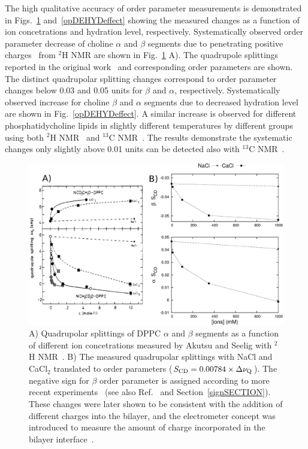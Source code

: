 \documentclass[aps,prl,superscriptaddress,twocolumn]{revtex4}
\begin{document}
The high qualitative accuracy of order parameter measurements is demonstrated in Figs.~\ref{opIONeffect} and~\ref{opDEHYDeffect}
showing the measured changes as a function of ion concetrations and hydration level, respectively.
Systematically observed order parameter decrease of choline $\alpha$ and $\beta$ segments due to penetrating 
positive charges~\cite{akutsu81,altenbach84,seelig87,scherer89} from $^2$H NMR are shown in Fig.~\ref{opIONeffect} A).
The quadrupole splittings reported in the original work~\cite{akutsu81} and corresponding order parameters 
are shown. The distinct quadrupolar splitting changes correspond to order parameter changes below 0.03 and 
0.05 units for $\beta$ and $\alpha$, respectively. Systematically observed increase for choline $\beta$ and $\alpha$
segments due to decreased hydration level are shown in Fig.~\ref{opDEHYDeffect}. 
A similar increase is observed for different phosphatidycholine lipids in slightly different temperatures by
different groups using both $^2$H NMR~\cite{bechinger91,ulrich94} and $^{13}$C NMR~\cite{dvinskikh05b}.
The results demonstrate the systematic changes only slightly above 0.01 units can be detected also with $^{13}$C NMR~\cite{dvinskikh05b}.

\begin{figure}[]
  \includegraphics[width=17.2cm]{../Fig/QPandOPwithIONS.eps}
  \caption{\label{opIONeffect}
    A) Quadrupolar splittings of DPPC $\alpha$ and $\beta$ segments as a function of different 
    ion concetrations measured by Akutsu and Seelig with $^2$H NMR~\cite{akutsu81}. 
    B) The measured quadrupolar splittings with NaCl and CaCl$_2$ translated to order parameters ($S_{{\rm CD}}=0.00784 \times \Delta \nu_{{\rm Q}}$). 
    The negative sign for $\beta$ order parameter is assigned according to more recent experiments~\cite{hong95a,hong95b,gross97} 
    (see also Ref.~\cite{botan15} and Section~\ref{signSECTION}). These changes were later shown to be consistent with the 
    addition of different charges into the bilayer, and the electrometer concept was introduced to measure the amount of charge 
    incorporated in the bilayer interface~\cite{akutsu81,altenbach84,seelig87,scherer89}.
  } 
\end{figure}
\end{document}
